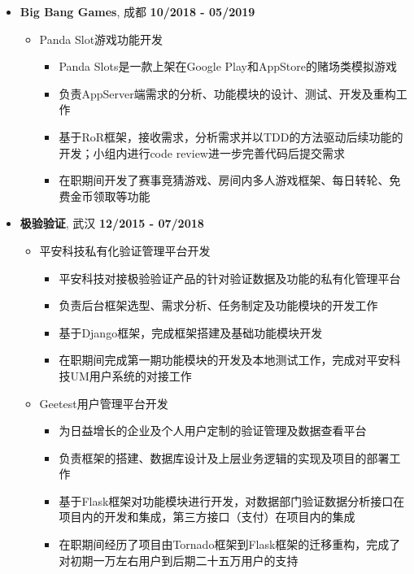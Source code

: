 \documentclass[11pt, a4paper,sans]{moderncv}     %
\begin{document}
\begin{itemize}

  \item{\yahei \textbf{Big Bang Games}, 成都 \hfill\textbf{10/2018 - 05/2019}}
  \begin{itemize}
    \item{\yahei Panda Slot游戏功能开发}
    \begin{itemize}
      \item{\yahei Panda Slots是一款上架在Google Play和AppStore的赌场类模拟游戏}
      \item{\yahei 负责AppServer端需求的分析、功能模块的设计、测试、开发及重构工作}
      \item{\yahei 基于RoR框架，接收需求，分析需求并以TDD的方法驱动后续功能的开发；小组内进行code review进一步完善代码后提交需求}
      \item{\yahei 在职期间开发了赛事竞猜游戏、房间内多人游戏框架、每日转轮、免费金币领取等功能}
    \end{itemize}
  \end{itemize}

  \item{\yahei \textbf{极验验证}, 武汉 \hfill\textbf{12/2015 - 07/2018}}
  \begin{itemize}
    \item{\yahei 平安科技私有化验证管理平台开发}
    \begin{itemize}
      \item{\yahei 平安科技对接极验验证产品的针对验证数据及功能的私有化管理平台}
      \item{\yahei 负责后台框架选型、需求分析、任务制定及功能模块的开发工作}
      \item{\yahei 基于Django框架，完成框架搭建及基础功能模块开发}
      \item{\yahei 在职期间完成第一期功能模块的开发及本地测试工作，完成对平安科技UM用户系统的对接工作}
    \end{itemize}

    \item{\yahei Geetest用户管理平台开发}
    \begin{itemize}
      \item{\yahei 为日益增长的企业及个人用户定制的验证管理及数据查看平台}
      \item{\yahei 负责框架的搭建、数据库设计及上层业务逻辑的实现及项目的部署工作}
      \item{\yahei 基于Flask框架对功能模块进行开发，对数据部门验证数据分析接口在项目内的开发和集成，第三方接口（支付）在项目内的集成}
      \item{\yahei 在职期间经历了项目由Tornado框架到Flask框架的迁移重构，完成了对初期一万左右用户到后期二十五万用户的支持}
    \end{itemize}


\end{itemize}
\end{itemize}
\end{document}
